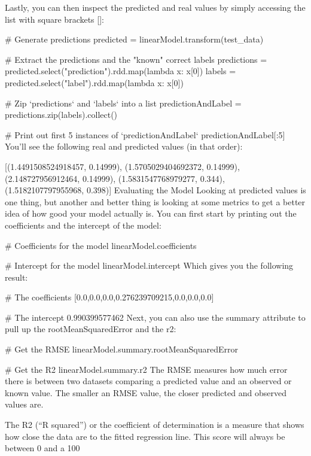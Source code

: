 \documentclass[a4paper,12pt]{article}
\begin{document}
Lastly, you can then inspect the predicted and real values by simply accessing the list with square brackets []:

# Generate predictions
predicted = linearModel.transform(test_data)

# Extract the predictions and the "known" correct labels
predictions = predicted.select("prediction").rdd.map(lambda x: x[0])
labels = predicted.select("label").rdd.map(lambda x: x[0])

# Zip `predictions` and `labels` into a list
predictionAndLabel = predictions.zip(labels).collect()

# Print out first 5 instances of `predictionAndLabel` 
predictionAndLabel[:5]
You’ll see the following real and predicted values (in that order):

[(1.4491508524918457, 0.14999), (1.5705029404692372, 0.14999), (2.148727956912464, 0.14999), (1.5831547768979277, 0.344), (1.5182107797955968, 0.398)]
Evaluating the Model
Looking at predicted values is one thing, but another and better thing is looking at some metrics to get a better idea of how good your model actually is. You can first start by printing out the coefficients and the intercept of the model:

# Coefficients for the model
linearModel.coefficients

# Intercept for the model
linearModel.intercept
Which gives you the following result:

# The coefficients
[0.0,0.0,0.0,0.276239709215,0.0,0.0,0.0]

# The intercept
0.990399577462
Next, you can also use the summary attribute to pull up the rootMeanSquaredError and the r2:

# Get the RMSE
linearModel.summary.rootMeanSquaredError

# Get the R2
linearModel.summary.r2
The RMSE measures how much error there is between two datasets comparing a predicted value and an observed or known value. The smaller an RMSE value, the closer predicted and observed values are.

The R2 (“R squared”) or the coefficient of determination is a measure that shows how close the data are to the fitted regression line. This score will always be between 0 and a 100%
\end{document}
